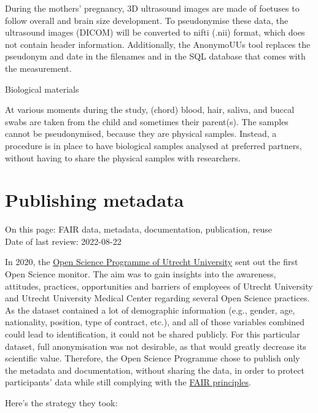 \documentclass[
]{book}
\begin{document}
During the mothers' pregnancy, 3D ultrasound images are made of foetuses
to follow overall and brain size development. To pseudonymise these data, the
ultrasound images (DICOM) will be converted to nifti (.nii) format, which does
not contain header information. Additionally, the AnonymoUUs tool replaces the
pseudonym and date in the filenames and in the SQL database that comes with the
measurement.

Biological materials

At various moments during the study, (chord) blood, hair, saliva, and
buccal swabs are taken from the child and sometimes their parent(s). The samples
cannot be pseudonymised, because they are physical samples. Instead, a procedure
is in place to have biological samples analysed at preferred partners, without
having to share the physical samples with researchers.

\hypertarget{open-science-questionnaire}{%
\chapter{Publishing metadata}\label{open-science-questionnaire}}

On this page: FAIR data, metadata, documentation, publication, reuse\\
Date of last review: 2022-08-22

In 2020, the \href{https://www.uu.nl/en/research/open-science}{Open Science Programme of Utrecht University}
sent out the first
Open Science monitor. The aim was to gain insights into the awareness,
attitudes, practices, opportunities and barriers of employees of Utrecht
University and Utrecht University Medical Center regarding several Open
Science practices. As the dataset contained a lot of demographic information
(e.g., gender, age, nationality, position, type of contract, etc.), and all of
those variables combined could lead to identification, it could not be shared
publicly. For this particular dataset, full anonymisation was not desirable,
as that would greatly decrease its scientific value. Therefore, the Open Science
Programme chose to publish only the metadata and documentation, without sharing
the data, in order to protect participants' data while still complying with the
\href{https://www.uu.nl/en/research/research-data-management/guides/how-to-make-your-data-fair}{FAIR principles}.

Here's the strategy they took:
\end{document}
